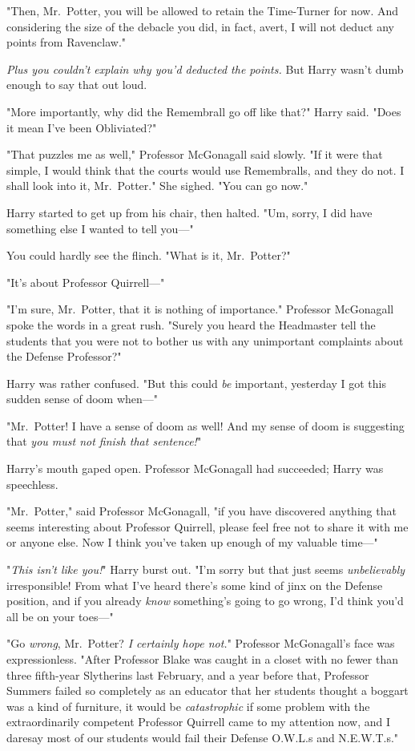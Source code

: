 "Then, Mr.~Potter, you will be allowed to retain the Time-Turner for now. And
considering the size of the debacle you did, in fact, avert, I will not deduct
any points from Ravenclaw."

\emph{Plus you couldn't explain why you'd deducted the points.} But Harry
wasn't dumb enough to say that out loud.

"More importantly, why did the Remembrall go off like that?" Harry said. "Does
it mean I've been Obliviated?"

"That puzzles me as well," Professor McGonagall said slowly. "If it were that
simple, I would think that the courts would use Remembralls, and they do not. I
shall look into it, Mr.~Potter." She sighed. "You can go now."

Harry started to get up from his chair, then halted. "Um, sorry, I did have
something else I wanted to tell you\mbox{---}"

You could hardly see the flinch. "What is it, Mr.~Potter?"

"It's about Professor Quirrell\mbox{---}"

"I'm sure, Mr.~Potter, that it is nothing of importance." Professor McGonagall
spoke the words in a great rush. "Surely you heard the Headmaster tell the
students that you were not to bother us with any unimportant complaints about
the Defense Professor?"

Harry was rather confused. "But this could \emph{be} important, yesterday I got
this sudden sense of doom when\mbox{---}"

"Mr.~Potter! I have a sense of doom as well! And my sense of doom is suggesting
that \emph{you must not finish that sentence!}"

Harry's mouth gaped open. Professor McGonagall had succeeded; Harry was
speechless.

"Mr.~Potter," said Professor McGonagall, "if you have discovered anything that
seems interesting about Professor Quirrell, please feel free not to share it
with me or anyone else. Now I think you've taken up enough of my valuable
time\mbox{---}"

"\emph{This isn't like you!}" Harry burst out. "I'm sorry but that just seems
\emph{unbelievably} irresponsible! From what I've heard there's some kind of
jinx on the Defense position, and if you already \emph{know} something's going
to go wrong, I'd think you'd all be on your toes\mbox{---}"

"Go \emph{wrong}, Mr.~Potter? \emph{I certainly hope not.}" Professor
McGonagall's face was expressionless. "After Professor Blake was caught in a
closet with no fewer than three fifth-year Slytherins last February, and a year
before that, Professor Summers failed so completely as an educator that her
students thought a boggart was a kind of furniture, it would be
\emph{catastrophic} if some problem with the extraordinarily competent
Professor Quirrell came to my attention now, and I daresay most of our students
would fail their Defense O.W.L.s and N.E.W.T.s."


